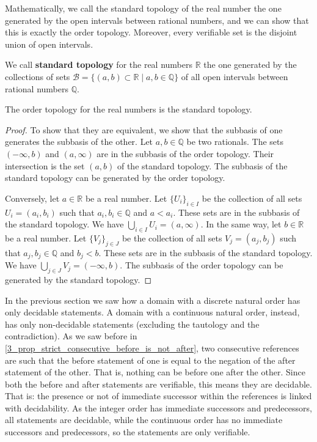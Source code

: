 \documentclass[11pt,letterpaper,fleqn]{memoir} %
\begin{document}
Mathematically, we call the standard topology of the real number the one generated by the open intervals between rational numbers, and we can show that this is exactly the order topology. Moreover, every verifiable set is the disjoint union of open intervals.

\begin{mathSection}
	\begin{defn}
		We call \textbf{standard topology} for the real numbers $\mathbb{R}$ the one generated by the collections of sets $\mathcal{B} = \{ (a,b) \subset \mathbb{R} \; | \; a,b \in \mathbb{Q} \}$ of all open intervals between rational numbers $\mathbb{Q}$.
	\end{defn}
	\begin{prop}
	The order topology for the real numbers is the standard topology.
\end{prop}
\begin{proof}
	To show that they are equivalent, we show that the subbasis of one generates the subbasis of the other. Let $a,b \in \mathbb{Q}$ be two rationals. The sets $(-\infty, b)$ and $(a, \infty)$ are in the subbasis of the order topology. Their intersection is the set $(a, b)$ of the standard topology. The subbasis of the standard topology can be generated by the order topology.
	
	Conversely, let $a \in \mathbb{R}$ be a real number. Let $\{U_i\}_{i \in I}$ be the collection of all sets $U_i = (a_i, b_i)$ such that $a_i, b_i \in \mathbb{Q}$ and $a < a_i$. These sets are in the subbasis of the standard topology. We have $\bigcup\limits_{i \in I} U_i = (a, \infty)$. In the same way, let $b \in \mathbb{R}$ be a real number. Let $\{V_j\}_{j \in J}$ be the collection of all sets $V_j = (a_j, b_j)$ such that $a_j, b_j \in \mathbb{Q}$ and $b_j < b$. These sets are in the subbasis of the standard topology. We have $\bigcup\limits_{j \in J} V_j = (-\infty, b)$. The subbasis of the order topology can be generated by the standard topology.
\end{proof}
\end{mathSection}

In the previous section we saw how a domain with a discrete natural order has only decidable statements. A domain with a continuous natural order, instead, has only non-decidable statements (excluding the tautology and the contradiction). As we saw before in \ref{3_prop_strict_consecutive_before_is_not_after}, two consecutive references are such that the before statement of one is equal to the negation of the after statement of the other. That is, nothing can be before one after the other. Since both the before and after statements are verifiable, this means they are decidable. That is: the presence or not of immediate successor within the references is linked with decidability. As the integer order has immediate successors and predecessors, all statements are decidable, while the continuous order has no immediate successors and predecessors, so the statements are only verifiable.
\end{document}
